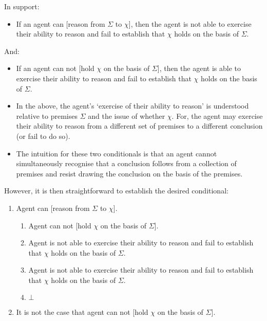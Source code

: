 \documentclass[10pt]{article}
\begin{document}
In support:

\begin{itemize}
\item If an agent can [reason from \(\Sigma\) to \(\chi\)], then the agent is not able to exercise their ability to reason and fail to establish that \(\chi\) holds on the basis of \(\Sigma\).
\end{itemize}

And:

\begin{itemize}
\item If an agent can not [hold \(\chi\) on the basis of \(\Sigma\)], then the agent is able to exercise their ability to reason and fail to establish that \(\chi\) holds on the basis of \(\Sigma\).
\end{itemize}

\begin{itemize}
\item In the above, the agent's `exercise of their ability to reason' is understood relative to premises \(\Sigma\) and the issue of whether \(\chi\).
For, the agent may exercise their ability to reason from a different set of premises to a different conclusion (or fail to do so).
\item The intuition for these two conditionals is that an agent cannot simultaneously recognise that a conclusion follows from a collection of premises and resist drawing the conclusion on the basis of the premises.
\end{itemize}

However, it is then straightforward to establish the desired conditional:

\begin{enumerate}
\item Agent can [reason from \(\Sigma\) to \(\chi\)].
  \begin{enumerate}
  \item Agent can not [hold \(\chi\) on the basis of \(\Sigma\)].
  \item\label{c1} Agent is not able to exercise their ability to reason and fail to establish that \(\chi\) holds on the basis of \(\Sigma\).
  \item\label{c2} Agent is not able to exercise their ability to reason and fail to establish that \(\chi\) holds on the basis of \(\Sigma\).
  \item \(\bot\)
  \end{enumerate}
\item It is not the case that agent can not [hold \(\chi\) on the basis of \(\Sigma\)].
\end{enumerate}
\end{document}
